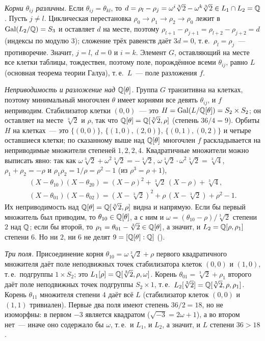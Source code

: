 \begin{aside}[2.4d]
\emph{Корни $\theta_{ij}$ различны.} Если $\theta_{ij}=\theta_{kl}$, то $d=\rho_l-\rho_j=\omega^i\sqrt[3]2-\omega^k\sqrt[3]2\in
L_1\cap L_2=\mathbb Q$. Пусть $j\ne l$. Циклическая перестановка $\rho_0\to\rho_1\to\rho_2\to\rho_0$ лежит в $\operatorname{Gal}(L_2/\mathbb Q)=S_3$ и
оставляет $d$ на месте, поэтому $\rho_{l+1}-\rho_{j+1}=\rho_{l+2}-\rho_{j+2}=d$ (индексы по модулю $3$); сложение трёх
равенств даёт $3d=0$, т.\,е.\ $\rho_l=\rho_j$~--- противоречие. Значит, $j=l$, $d=0$ и $i=k$. Элемент $G$, оставляющий на
месте все клетки таблицы, тождествен, поэтому поле, порождённое всеми $\theta_{ij}$, равно $L$ (основная теорема теории
Галуа), т.\,е.\ $L$~--- поле разложения $f$.

\emph{Неприводимость и разложение над $\mathbb Q[\theta]$.} Группа $G$ транзитивна на клетках, поэтому минимальный многочлен
$\theta$ имеет корнями все девять $\theta_{ij}$, и $f$ неприводим. Стабилизатор клетки $(0,0)$~--- это
$H=\operatorname{Gal}(L/\mathbb Q[\theta])=S_2\times S_2$; он оставляет на месте $\sqrt[3]2$ и $\rho$, так что $\mathbb Q[\theta]=\mathbb Q[\sqrt[3]2,\rho]$
(степень $36/4=9$). Орбиты $H$ на клетках~--- это $\{(0,0)\}$, $\{(1,0),(2,0)\}$, $\{(0,1),(0,2)\}$ и четыре
оставшиеся клетки; по сказанному выше над $\mathbb Q[\theta]$ многочлен $f$ раскладывается на неприводимые множители степеней
$1,2,2,4$. Квадратичные множители можно выписать явно: так как $\omega\sqrt[3]2+\omega^2\sqrt[3]2=-\sqrt[3]2$,
$\omega\sqrt[3]2\cdot\omega^2\sqrt[3]2=\sqrt[3]4$, $\rho_1+\rho_2=-\rho$ и $\rho_1\rho_2=1/\rho=\rho^2-1$ (из $\rho^3=\rho+1$),
\begin{gather*}
(X-\theta_{10})(X-\theta_{20})=(X-\rho)^2+\sqrt[3]2\,(X-\rho)+\sqrt[3]4,\\
(X-\theta_{01})(X-\theta_{02})=(X-\sqrt[3]2)^2+\rho\,(X-\sqrt[3]2)+\rho^2-1 .
\end{gather*}
Их неприводимость над $\mathbb Q[\theta]=\mathbb Q[\sqrt[3]2,\rho]$ видна и напрямую. Если бы первый множитель был приводим, то
$\theta_{10}\in\mathbb Q[\theta]$, а с ним и $\omega=(\theta_{10}-\rho)/\sqrt[3]2$ степени $2$ над $\mathbb Q$; если бы второй, то
$\rho_1=\theta_{01}-\sqrt[3]2\in\mathbb Q[\theta]$, а значит, и $L_2=\mathbb Q[\rho,\rho_1]$ степени $6$. Но ни $2$, ни $6$ не делят
$9=[\mathbb Q[\theta]:\mathbb Q]$ ().

\emph{Три поля.} Присоединение корня $\theta_{10}=\omega\sqrt[3]2+\rho$ первого квадратичного множителя даёт поле
неподвижных точек стабилизатора клеток $(0,0)$ и $(1,0)$, т.\,е.\ подгруппы $1\times S_2$; это $L_1[\rho]=\mathbb Q[\sqrt[3]2,\rho,\omega]$.
Корень $\theta_{01}=\sqrt[3]2+\rho_1$ второго даёт поле неподвижных точек подгруппы $S_2\times1$, т.\,е.\
$L_2[\sqrt[3]2]=\mathbb Q[\sqrt[3]2,\rho,\rho_1]$. Корень $\theta_{11}$ множителя степени $4$ даёт всё $L$ (стабилизатор клеток
$(0,0)$ и $(1,1)$ тривиален). Первые два поля имеют степень $36/2=18$, но не изоморфны: в первом $-3$ является
квадратом ($\sqrt{-3}=2\omega+1$), а во втором нет~--- иначе оно содержало бы $\omega$, т.\,е.\ и $L_1$, и $L_2$, а
значит, и $L$ степени $36>18$.


\end{aside}
